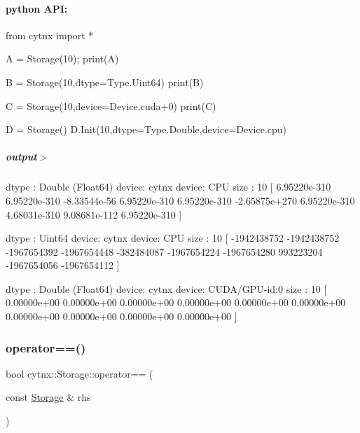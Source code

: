  \paragraph*{python A\+PI\+:}


\begin{DoxyCodeInclude}
\textcolor{keyword}{from} cytnx \textcolor{keyword}{import} *

A = Storage(10);
print(A)

B = Storage(10,dtype=Type.Uint64)
print(B)

C = Storage(10,device=Device.cuda+0)
print(C)

D = Storage()
D.Init(10,dtype=Type.Double,device=Device.cpu)


\end{DoxyCodeInclude}
 \subparagraph*{output$>$}


\begin{DoxyVerbInclude}
dtype : Double (Float64)
device: cytnx device: CPU
size  : 10
[ 6.95220e-310 6.95220e-310 -8.33544e-56 6.95220e-310 6.95220e-310 -2.65875e+270 6.95220e-310 4.68031e-310 9.08681e-112 6.95220e-310 ]

dtype : Uint64
device: cytnx device: CPU
size  : 10
[         -1942438752         -1942438752         -1967654392         -1967654448          -382484087         -1967654224         -1967654280           993223204         -1967654056         -1967654112  ]

dtype : Double (Float64)
device: cytnx device: CUDA/GPU-id:0
size  : 10
[ 0.00000e+00 0.00000e+00 0.00000e+00 0.00000e+00 0.00000e+00 0.00000e+00 0.00000e+00 0.00000e+00 0.00000e+00 0.00000e+00 ]




\end{DoxyVerbInclude}
 \mbox{\label{classcytnx_1_1Storage_ad304e00cf3d472ea0355af6b40c4529d}} 
\subsubsection{\texorpdfstring{operator==()}{operator==()}}
{\footnotesize\ttfamily bool cytnx\+::\+Storage\+::operator== (\begin{DoxyParamCaption}\item[{const \hyperlink{classcytnx_1_1Storage}{Storage} \&}]{rhs }\end{DoxyParamCaption})}



